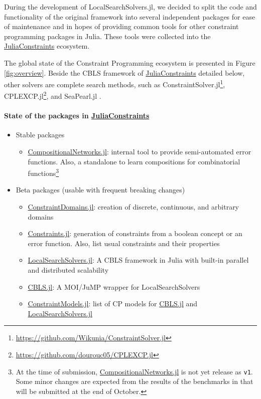 \documentclass{juliacon}
\newcommand{\jc}{\href{https://github.com/JuliaConstraints}{JuliaConstraints}\xspace}
\newcommand{\cdjl}{\href{https://github.com/JuliaConstraints/ConstraintDomains.jl}{ConstraintDomains.jl}\xspace}
\newcommand{\cnjl}{\href{https://github.com/JuliaConstraints/CompositionalNetworks.jl}{CompositionalNetworks.jl}\xspace}
\newcommand{\cjl}{\href{https://github.com/JuliaConstraints/Constraints.jl}{Constraints.jl}\xspace}
\newcommand{\cmjl}{\href{https://github.com/JuliaConstraints/ConstraintModels.jl}{ConstraintModels.jl}\xspace}
\newcommand{\lssjl}{\href{https://github.com/JuliaConstraints/LocalSearchSolvers.jl}{LocalSearchSolvers.jl}\xspace}
\newcommand{\cblsjl}{\href{https://github.com/JuliaConstraints/CBLS.jl}{CBLS.jl}\xspace}
\begin{document}
During the development of LocalSearchSolvers.jl, we decided to split the code and functionality of the original framework into several independent packages for ease of maintenance and in hopes of providing common tools for other constraint programming packages in Julia. These tools were collected into the \jc ecosystem.

The global state of the Constraint Programming ecosystem is presented in Figure \ref{fig:overview}. Beside the CBLS framework of \jc detailed below, other solvers are complete search methods, such as ConstraintSolver.jl\footnote{\url{https://github.com/Wikunia/ConstraintSolver.jl}}, CPLEXCP.jl\footnote{\url{https://github.com/dourouc05/CPLEXCP.jl}}, and SeaPearl.jl \cite{chalumeau2021seapearl}.

\paragraph*{State of the packages in \jc}

\begin{itemize}
  \item Stable packages
  \begin{itemize}
    \item \cnjl: internal tool to provide semi-automated error functions. Also, a standalone to learn compositions for combinatorial functions\footnote{At the time of submission, \cnjl is not yet release as \texttt{v1}. Some minor changes are expected from the results of the benchmarks in \cite{baffier2022interpretable} that will be submitted at the end of October.}
  \end{itemize}
  \item Beta packages (usable with frequent breaking changes)
  \begin{itemize}
    \item \cdjl: creation of discrete, continuous, and arbitrary domains
    \item \cjl: generation of constraints from a boolean concept or an error function. Also, list usual constraints and their properties
    \item \lssjl: A CBLS framework in Julia with built-in parallel and distributed scalability
    \item \cblsjl: A MOI/JuMP wrapper for LocalSearchSolvers
    \item \cmjl: list of CP models for \cblsjl and \lssjl
  \end{itemize}

\end{itemize}
\end{document}
